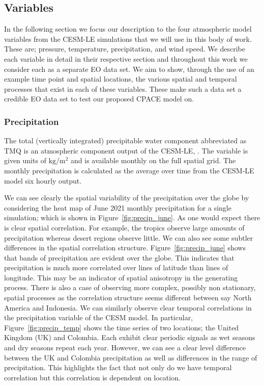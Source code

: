  \subsection{Variables \label{ssec:variables}}
 In the following section we focus our description to the four atmospheric model variables from the  CESM-LE simulations that we will use in this body of work.
 These are; pressure, temperature, precipitation, and wind speed.
 We describe each variable in detail in their respective section and throughout this work we consider each as a separate EO data set.
 We aim to show, through the use of an example time point and spatial locations, the various spatial and temporal processes that exist in each of these variables.
 These make such a data set a credible EO data set to test our proposed CPACE model on. 

\subsubsection{Precipitation \label{sssec:precip}}
The total (vertically integrated) precipitable water component abbreviated as TMQ is an atmospheric component output of the CESM-LE, \citep{kay_community_2015}.
The variable is given units of $\si{\kilogram\per\metre\squared} $ and is available monthly on the full spatial grid.
The monthly precipitation is calculated as the average over time from the  CESM-LE model six hourly output. 

We can see clearly the spatial variability of the precipitation over the globe by considering the heat map of June 2021 monthly precipitation for a single simulation; which is shown in Figure~\ref{fig:precip_june}. 
As one would expect there is clear spatial correlation.
For example, the tropics observe large amounts of precipitation whereas desert regions observe little. 
We can also see some subtler differences in the spatial correlation structure. 
Figure~\ref{fig:precip_june} shows that bands of precipitation are evident over the globe.
This indicates that precipitation is much more correlated over lines of latitude than lines of longitude. 
This may be an indicator of spatial anisotropy in the generating process.
There is also a case of observing more complex, possibly non stationary, spatial processes as the correlation structure seems different between say North America and Indonesia. 
We can similarly observe clear temporal correlations in the precipitation variable of the CESM model.
In particular, Figure~\ref{fig:precip_temp} shows the time series of two locations; the United Kingdom (UK) and Colombia.
Each exhibit clear periodic signals as wet seasons and dry seasons repeat each year.
However, we can see a clear level difference between the UK and Colombia precipitation as well as differences in the range of precipitation.
This highlights the fact that not only do we have temporal correlation but this correlation is dependent on location. 

